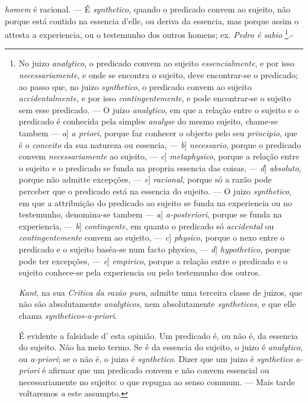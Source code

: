  \emph{homem} é racional. --- É \emph{synthetico}, quando o predicado convem ao sujeito, não porque está contido na essencia d'elle, ou deriva da essencia, mas porque assim o attesta a experiencia, ou o testemunho dos outros homens; ex. \emph{Pedro é sabio} \footnote{No juizo \emph{analytico}, o predicado convem ao sujeito \emph{essencialmente}, e por isso \emph{necessariamente}, e onde se encontra o sujeito, deve encontrar-se o predicado; ao passo que, no juizo \emph{synthetico}, o predicado convem ao sujeito \emph{accidentalmente}, e por isso \emph{contingentemente}, e pode encontrar-se o sujeito sem esse predicado. --- O juizo \emph{analytico}, em que a relação entre o sujeito e o predicado é conhecida pela simples \emph{analyse} do mesmo sujeito, chame-se tambem --- \emph{a}] \emph{a priori}, porque faz conhecer o objecto pelo seu \emph{principio}, que é o \emph{conceito} da sua natureza ou essencia, --- \emph{b}] \emph{necessario}, porque o predicado convem \emph{necessariamente} ao sujeito, --- \emph{c}] \emph{metaphysico}, porque a relação entre o sujeito e o predicado se funda na propria essencia das coisas, --- \emph{d}] \emph{absoluto}, porque não admitte excepções, --- \emph{e}] \emph{racional}, porque só a razão pode perceber que o predicado está na essencia do sujeito. --- O juizo \emph{synthetico}, em que a attribuição do predicado ao sujeito se funda na experiencia ou no testemunho, denomina-se tambem --- \emph{a}] \emph{a-posteriori}, porque se funda na experiencia, --- \emph{b}] \emph{contingente}, em quanto o predicado só \emph{accidental} ou \emph{contingentemente} convem ao sujeito, --- \emph{c}] \emph{physico}, porque o nexo entre o predicado e o sujeito baséa-se num facto physico, --- \emph{d}] \emph{hypothetico}, porque pode ter excepções, --- \emph{e}] \emph{empirico}, porque a relação entre o predicado e o sujeito conhece-se pela experiencia ou pelo testemunho dos outros.\par \emph{Kant}, na sua \emph{Critica da razão pura}, admitte uma terceira classe de juizos, que não são absolutamente \emph{analyticos}, nem absolutamente \emph{syntheticos}, e que elle chama \emph{syntheticos-a-priori}.\par É evidente a falsidade d' esta opinião. Um predicado é, ou não é, da essencia do sujeito. Não ha meio termo. Se é da essencia do sujeito, o juizo é \emph{analytico}, ou \emph{a-priori}; se o não é, o juizo é \emph{synthetico}. Dizer que um juizo é \emph{synthetico a-priori} é afirmar que um predicado convem e não convem essencial ou necessariamente no sujeito: o que repugna ao senso commum. --- Mais tarde voltaremos \emph{a} este assumpto.}.-

